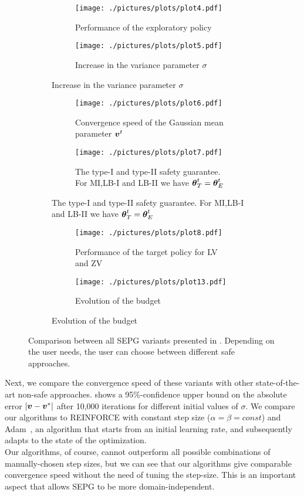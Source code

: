 \begin{figure}[t!]
\centering
\begin{subfigure}[t]{\textwidth}
\begin{subfigure}[t]{0.5\textwidth}
\texttt{[image: ./pictures/plots/plot4.pdf]}
\caption{Performance of the exploratory policy} \label{fig:plot2-1}
\end{subfigure}
\hfill
\begin{subfigure}[t]{0.5\textwidth}
\texttt{[image: ./pictures/plots/plot5.pdf]}
\caption{Increase in the variance parameter $\sigma$} \label{fig:plot2-2}
\end{subfigure}
\end{subfigure}
\begin{subfigure}[t]{\textwidth}
\begin{subfigure}[t]{0.5\textwidth}
\texttt{[image: ./pictures/plots/plot6.pdf]}
\caption{Convergence speed of the Gaussian mean parameter $\boldsymbol{v}^t$} \label{fig:plot2-3}
\end{subfigure}
\hfill
\begin{subfigure}[t]{0.5\textwidth}
\texttt{[image: ./pictures/plots/plot7.pdf]}
\caption{The type-I and type-II safety guarantee. For MI,LB-I and LB-II we have ${\boldsymbol{\theta}}^t_T = {\boldsymbol{\theta}}^t_E$} \label{fig:plot2-4}
\end{subfigure}
\end{subfigure}
\begin{subfigure}[t]{\textwidth}
\begin{subfigure}[t]{0.5\textwidth}
\texttt{[image: ./pictures/plots/plot8.pdf]}
\caption{Performance of the target policy for LV and ZV} \label{fig:plot2-5}
\end{subfigure}
\begin{subfigure}[t]{0.5\textwidth}
\texttt{[image: ./pictures/plots/plot13.pdf]}
\caption{Evolution of the budget} \label{fig:plot2-6}
\end{subfigure}
\end{subfigure}

\caption{Comparison between all SEPG variants presented in . Depending on the user needs, the user can choose between different safe approaches. }
\label{fig:plot2}
\end{figure}

Next, we compare the convergence speed of these variants with other state-of-the-art non-safe approaches.
 shows a 95\%-confidence upper bound  on the absolute error $|\boldsymbol{v} - \boldsymbol{v}^*|$ after 10,000 iterations for different initial values of $\sigma$. We compare our algorithms to REINFORCE with constant step size ($\alpha = \beta = const$) and Adam~\cite{kingma2014adam}, an algorithm that starts from an initial learning rate, and subsequently adapts to the state of the optimization. \\
Our algorithms, of course, cannot outperform all possible combinations of manually-chosen step sizes, but we can see that our algorithms give comparable convergence speed without the need of tuning the step-size. This is an important aspect that allows SEPG to be more domain-independent.

